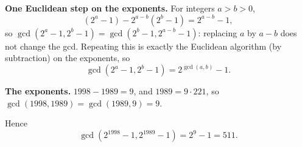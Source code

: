\textbf{One Euclidean step on the exponents.} For integers $a>b>0$,
\[
\left(2^a-1\right)-2^{a-b}\left(2^b-1\right)=2^{a-b}-1,
\]
so $\gcd\left(2^a-1,2^b-1\right)=\gcd\left(2^b-1,2^{a-b}-1\right)$: replacing $a$ by $a-b$ does not change the gcd. Repeating this is exactly the Euclidean algorithm (by subtraction) on the exponents, so
\[
\gcd\left(2^a-1,2^b-1\right)=2^{\gcd(a,b)}-1 .
\]

\textbf{The exponents.} $1998-1989=9$, and $1989=9\cdot221$, so $\gcd(1998,1989)=\gcd(1989,9)=9$.

Hence
\[
\gcd\left(2^{1998}-1,2^{1989}-1\right)=2^9-1=\boxed{511}.
\]
